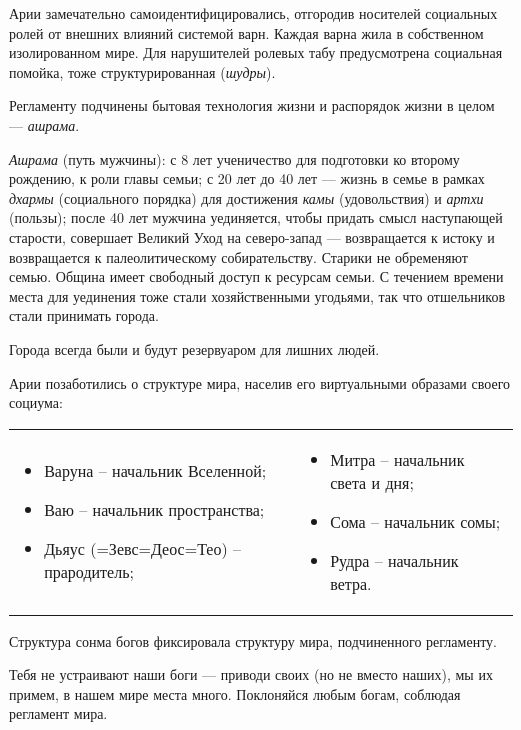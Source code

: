 Арии замечательно самоидентифицировались, отгородив носителей социальных ролей от внешних влияний системой варн. Каждая
варна жила в собственном изолированном мире. Для нарушителей ролевых табу предусмотрена социальная помойка, тоже
структурированная (\textit{шудры}).

Регламенту подчинены бытовая технология жизни и распорядок жизни в целом — \textit{ашрама}.

\textit{Ашрама }(путь мужчины): с 8 лет ученичество для подготовки ко второму рождению, к роли главы семьи; с 20 лет до
40 лет — жизнь в семье в рамках \textit{дхармы }(социального порядка) для достижения \textit{камы} (удовольствия) и
\textit{артхи} (пользы); после 40 лет мужчина уединяется, чтобы придать смысл наступающей старости, совершает Великий
Уход на северо-запад — возвращается к истоку и возвращается к палеолитическому собирательству. Старики не обременяют
семью. Община имеет свободный доступ к ресурсам семьи. С течением времени места для уединения тоже стали хозяйственными
угодьями, так что отшельников стали принимать города.

Города всегда были и будут резервуаром для лишних людей.

Арии позаботились о структуре мира, населив его виртуальными образами своего социума:

\begin{flushleft}
\tablefirsthead{}
\tablehead{}
\tabletail{}
\tablelasttail{}
\begin{supertabular}{m{3in}m{3in}}
\begin{itemize}
\item Варуна – начальник Вселенной;
\item Ваю – начальник пространства;
\item Дьяус (=Зевс=Деос=Тео) – прародитель;
\end{itemize}
 &
\begin{itemize}
\item Митра – начальник света и дня;
\item Сома – начальник сомы;
\item Рудра – начальник ветра.
\end{itemize}
\\
\end{supertabular}
\end{flushleft}
Структура сонма богов фиксировала структуру мира, подчиненного регламенту.


Тебя не устраивают наши боги — приводи своих (но не вместо наших), мы их примем, в нашем мире места много. Поклоняйся
любым богам, соблюдая регламент мира.

